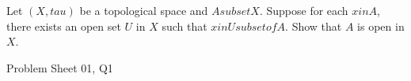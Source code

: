 \begin{samepage}
\begin{ex}
Let $(X, tau)$ be a topological space and $A subset X$.
Suppose for each $x in A$, there exists an open set $U$ in $X$ such that $x in U subset of A$. Show that $A$ is open in $X$.
\end{ex}
\begin{source}
Problem Sheet 01, Q1
\end{source}
\end{samepage}
